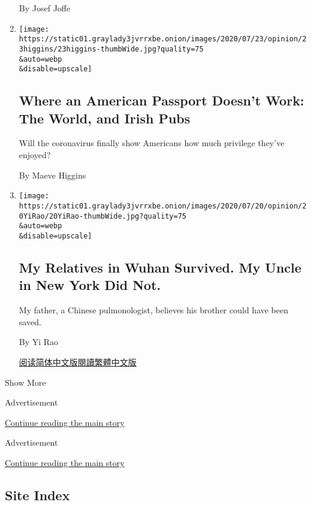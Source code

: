 \begin{enumerate}
  By Josef Joffe
\item
  \href{/2020/07/23/opinion/passport-coronavirus-travel.html}{}

  \texttt{[image: https://static01.graylady3jvrrxbe.onion/images/2020/07/23/opinion/23higgins/23higgins-thumbWide.jpg?quality=75\\\&auto=webp\\\&disable=upscale]}

  \hypertarget{where-an-american-passport-doesnt-work-the-world-and-irish-pubs}{%
  \subsection{Where an American Passport Doesn't Work: The World, and
  Irish
  Pubs}\label{where-an-american-passport-doesnt-work-the-world-and-irish-pubs}}

  Will the coronavirus finally show Americans how much privilege they've
  enjoyed?

  By Maeve Higgins
\item
  \href{/2020/07/22/opinion/coronavirus-china-us.html}{}

  \texttt{[image: https://static01.graylady3jvrrxbe.onion/images/2020/07/20/opinion/20YiRao/20YiRao-thumbWide.jpg?quality=75\\\&auto=webp\\\&disable=upscale]}

  \hypertarget{my-relatives-in-wuhan-survived-my-uncle-in-new-york-did-not}{%
  \subsection{My Relatives in Wuhan Survived. My Uncle in New York Did
  Not.}\label{my-relatives-in-wuhan-survived-my-uncle-in-new-york-did-not}}

  My father, a Chinese pulmonologist, believes his brother could have
  been saved.

  By Yi Rao

  \href{https://cn.nytimes3xbfgragh.onion/opinion/20200723/coronavirus-china-us/}{阅读简体中文版}\href{https://cn.nytimes3xbfgragh.onion/opinion/20200723/coronavirus-china-us/zh-hant/}{閱讀繁體中文版}
\end{enumerate}

Show More

Advertisement

\protect\hyperlink{after-mid1}{Continue reading the main story}

Advertisement

\protect\hyperlink{after-mktg}{Continue reading the main story}

\hypertarget{site-index}{%
\subsection{Site Index}\label{site-index}}

